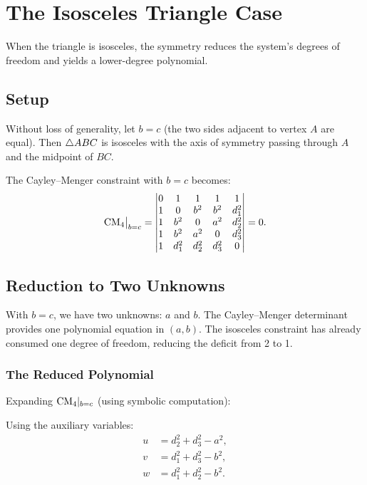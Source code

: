 
\chapter{The Isosceles Triangle Case}
\label{ch:isosceles}

When the triangle is isosceles, the symmetry reduces the system's degrees of freedom and yields a lower-degree polynomial.

\section{Setup}

Without loss of generality, let $b = c$ (the two sides adjacent to vertex $A$ are equal). Then $\triangle ABC$ is isosceles with the axis of symmetry passing through $A$ and the midpoint of $BC$.

The Cayley--Menger constraint with $b = c$ becomes:
\begin{equation}
\mathrm{CM}_4\big|_{b=c} = \begin{vmatrix}
0 & 1 & 1 & 1 & 1 \\
1 & 0 & b^2 & b^2 & d_1^2 \\
1 & b^2 & 0 & a^2 & d_2^2 \\
1 & b^2 & a^2 & 0 & d_3^2 \\
1 & d_1^2 & d_2^2 & d_3^2 & 0
\end{vmatrix} = 0.
\end{equation}

\section{Reduction to Two Unknowns}

With $b = c$, we have two unknowns: $a$ and $b$. The Cayley--Menger determinant provides one polynomial equation in $(a, b)$. The isosceles constraint has already consumed one degree of freedom, reducing the deficit from 2 to 1.

\subsection{The Reduced Polynomial}

Expanding $\mathrm{CM}_4|_{b=c}$ (using symbolic computation):

Using the auxiliary variables:
\begin{align}
u &= d_2^2 + d_3^2 - a^2, \\
v &= d_1^2 + d_3^2 - b^2, \\
w &= d_1^2 + d_2^2 - b^2.
\end{align}

